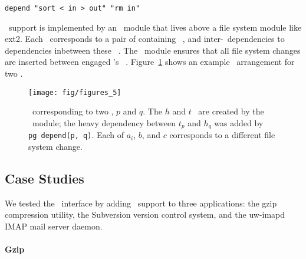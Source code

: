 \vspace{-0.5\baselineskip}
\begin{center}
\begin{small}
\verb+depend "sort < in > out" "rm in"+
\end{small}
\end{center}
\vspace{-0.5\baselineskip}


\Patchgroup\ support is implemented by an \LFS\ module that lives above a file
system module like ext2.
%
Each \patchgroup\ corresponds to a pair of containing \noop\ \patches,
and inter-\patchgroup\ dependencies to dependencies inbetween these \noop\
\patches.
%
The \LFS\ module ensures that all file system changes are inserted
between engaged \patchgroups's \noop\ \patches.
%
Figure~\ref{fig:patchgroup-patches} shows an example \patch\ arrangement for
two \patchgroups.

\begin{figure}[t]
\centering
\texttt{[image: fig/figures\_5]}
\caption{\label{fig:patchgroup-patches} \Patches\ corresponding to two
  \patchgroups, $p$ and $q$.  The $h$ and $t$ \patches\ are created by the 
  \patchgroup\ module; the heavy dependency between $t_p$ and $h_q$ was added
  by \texttt{pg~depend(p, q)}.  Each of $a_i$, $b$, and $c$ corresponds to
  a different file system change.}
\end{figure}

\subsection{Case Studies}
\label{sec:patchgroup:casestudies}


We tested the \patchgroup\ interface by adding \patchgroup\ support to three
applications: the gzip compression utility, the Subversion version control
system, and the uw-imapd IMAP mail server daemon.


\paragraph{Gzip}
\label{sec:patchgroup:gzip}

